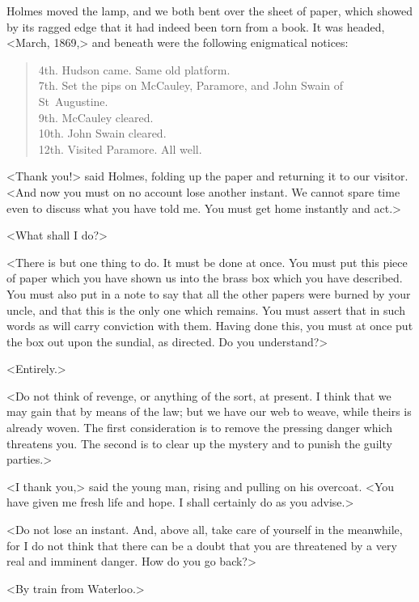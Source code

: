 Holmes moved the lamp, and we both bent over the sheet of paper, which showed by its ragged edge that it had indeed been torn from a book. It was headed, <March, 1869,> and beneath were the following enigmatical notices:

\blockquote{
4th. Hudson came. Same old platform.\\

7th. Set the pips on McCauley, Paramore, and John Swain of St~Augustine.\\

9th. McCauley cleared.\\

10th. John Swain cleared.\\

12th. Visited Paramore. All well.}

<Thank you!> said Holmes, folding up the paper and returning it to our visitor. <And now you must on no account lose another instant. We cannot spare time even to discuss what you have told me. You must get home instantly and act.>

<What shall I do?>

<There is but one thing to do. It must be done at once. You must put this piece of paper which you have shown us into the brass box which you have described. You must also put in a note to say that all the other papers were burned by your uncle, and that this is the only one which remains. You must assert that in such words as will carry conviction with them. Having done this, you must at once put the box out upon the sundial, as directed. Do you understand?>

<Entirely.>

<Do not think of revenge, or anything of the sort, at present. I think that we may gain that by means of the law; but we have our web to weave, while theirs is already woven. The first consideration is to remove the pressing danger which threatens you. The second is to clear up the mystery and to punish the guilty parties.>

<I thank you,> said the young man, rising and pulling on his overcoat. <You have given me fresh life and hope. I shall certainly do as you advise.>

<Do not lose an instant. And, above all, take care of yourself in the meanwhile, for I do not think that there can be a doubt that you are threatened by a very real and imminent danger. How do you go back?>

<By train from Waterloo.>

